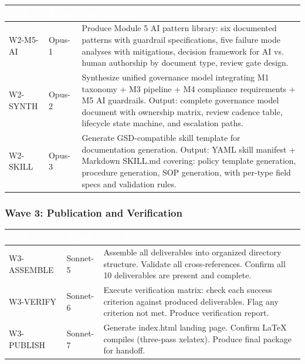 \documentclass[11pt,letterpaper]{article}
\newcommand{\tableheader}[1]{\textbf{\sffamily\textcolor{white}{#1}}}
\begin{document}
\begin{center}
\begin{tabularx}{\textwidth}{L{3cm}L{2.5cm}X}
\toprule
{}
\tableheader{Task} & \tableheader{Agent} & \tableheader{Specification} \\
\midrule
W2-M5-AI & Opus-1 & Produce Module 5 AI pattern library: six documented patterns with guardrail specifications, five failure mode analyses with mitigations, decision framework for AI vs. human authorship by document type, review gate design. \\
W2-SYNTH & Opus-2 & Synthesize unified governance model integrating M1 taxonomy + M3 pipeline + M4 compliance requirements + M5 AI guardrails. Output: complete governance model document with ownership matrix, review cadence table, lifecycle state machine, and escalation paths. \\
W2-SKILL & Opus-3 & Generate GSD-compatible skill template for documentation generation. Output: YAML skill manifest + Markdown SKILL.md covering: policy template generation, procedure generation, SOP generation, with per-type field specs and validation rules. \\
\bottomrule
\end{tabularx}
\end{center}

\subsubsection{Wave 3: Publication and Verification}

\begin{center}
\begin{tabularx}{\textwidth}{L{3cm}L{2.5cm}X}
\toprule
{}
\tableheader{Task} & \tableheader{Agent} & \tableheader{Specification} \\
\midrule
W3-ASSEMBLE & Sonnet-5 & Assemble all deliverables into organized directory structure. Validate all cross-references. Confirm all 10 deliverables are present and complete. \\
W3-VERIFY & Sonnet-6 & Execute verification matrix: check each success criterion against produced deliverables. Flag any criterion not met. Produce verification report. \\
W3-PUBLISH & Sonnet-7 & Generate index.html landing page. Confirm LaTeX compiles (three-pass xelatex). Produce final package for handoff. \\
\bottomrule
\end{tabularx}
\end{center}
\end{document}
